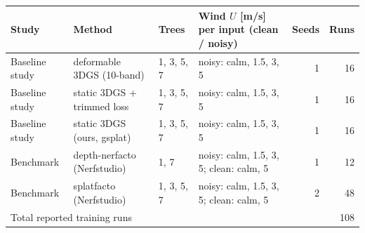 \begin{tabular}{llllrr}
\toprule
Study & Method & Trees & Wind $U$ [m/s] per input (clean / noisy) & Seeds & Runs \\
\midrule
Baseline study & deformable 3DGS (10-band) & 1, 3, 5, 7 & noisy: calm, 1.5, 3, 5 & 1 & 16 \\
Baseline study & static 3DGS + trimmed loss & 1, 3, 5, 7 & noisy: calm, 1.5, 3, 5 & 1 & 16 \\
Baseline study & static 3DGS (ours, gsplat) & 1, 3, 5, 7 & noisy: calm, 1.5, 3, 5 & 1 & 16 \\
Benchmark & depth-nerfacto (Nerfstudio) & 1, 7 & noisy: calm, 1.5, 3, 5; clean: calm, 5 & 1 & 12 \\
Benchmark & splatfacto (Nerfstudio) & 1, 3, 5, 7 & noisy: calm, 1.5, 3, 5; clean: calm, 5 & 2 & 48 \\
\midrule
\multicolumn{5}{l}{Total reported training runs} & 108 \\
\bottomrule
\end{tabular}
